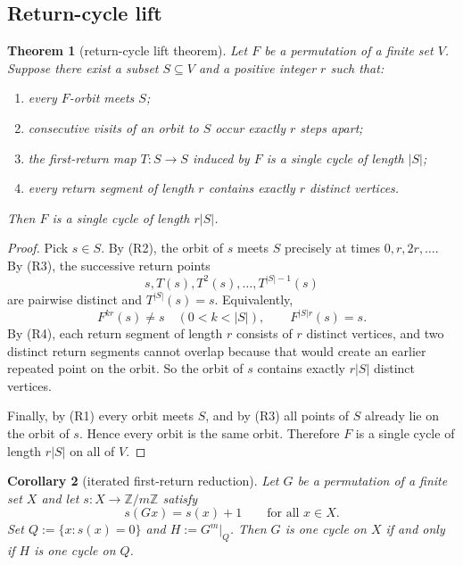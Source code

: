 \documentclass[11pt]{article}
\newtheorem{theorem}{Theorem}[section]
\newtheorem{corollary}[theorem]{Corollary}
\newcommand{\Z}{\mathbb Z}
\begin{document}
\subsection{Return-cycle lift}

\begin{theorem}[return-cycle lift theorem]
\label{thm:return-cycle-lift}
Let $F$ be a permutation of a finite set $V$.
Suppose there exist a subset $S\subseteq V$ and a positive integer $r$ such
that:
\begin{enumerate}[label=\textup{(R\arabic*)},leftmargin=2.8em]
\item every $F$-orbit meets $S$;
\item consecutive visits of an orbit to $S$ occur exactly $r$ steps apart;
\item the first-return map $T:S\to S$ induced by $F$ is a single cycle of
      length $|S|$;
\item every return segment of length $r$ contains exactly $r$ distinct
      vertices.
\end{enumerate}
Then $F$ is a single cycle of length $r|S|$.
\end{theorem}

\begin{proof}
Pick $s\in S$.
By (R2), the orbit of $s$ meets $S$ precisely at times $0,r,2r,\dots$.
By (R3), the successive return points
\[
s,T(s),T^2(s),\dots,T^{|S|-1}(s)
\]
are pairwise distinct and $T^{|S|}(s)=s$.
Equivalently,
\[
F^{kr}(s)\neq s\quad (0<k<|S|),
\qquad
F^{|S|r}(s)=s.
\]
By (R4), each return segment of length $r$ consists of $r$ distinct vertices,
and two distinct return segments cannot overlap because that would create an
earlier repeated point on the orbit. So the orbit of $s$ contains exactly
$r|S|$ distinct vertices.

Finally, by (R1) every orbit meets $S$, and by (R3) all points of $S$ already
lie on the orbit of $s$. Hence every orbit is the same orbit.
Therefore $F$ is a single cycle of length $r|S|$ on all of $V$.
\end{proof}

\begin{corollary}[iterated first-return reduction]
\label{cor:iterated-first-return}
Let $G$ be a permutation of a finite set $X$ and let $s:X\to\Z/m\Z$ satisfy
\[
s(Gx)=s(x)+1
\qquad\text{for all }x\in X.
\]
Set $Q:=\{x:s(x)=0\}$ and $H:=G^m|_Q$. Then $G$ is one cycle on $X$ if and
only if $H$ is one cycle on $Q$.
\end{corollary}
\end{document}
